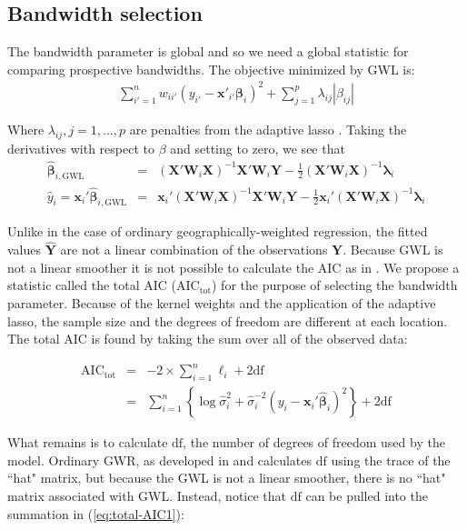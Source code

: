 \documentclass[authoryear, review, 11pt]{elsarticle}
\begin{document}
	\subsection{Bandwidth selection}
	The bandwidth parameter is global and so we need a global statistic for comparing prospective bandwidths. The objective minimized by GWL is:	
	\begin{eqnarray}
		\sum_{i'=1}^n w_{ii'} \left(y_{i'} - \bm{x}'_{i'} \bm{\beta}_i \right)^2 + \sum_{j=1}^p \lambda_{ij} |\beta_{ij}|
	\end{eqnarray}
	
	Where $\lambda_{ij}, j =1, \dots, p$ are penalties from the adaptive lasso \citep{Zou:2006}. Taking the derivatives with respect to $\beta$ and setting to zero, we see that
	\begin{eqnarray}
		\hat{\bm{\beta}}_{i, \text{GWL}} &=& \left( \bm{X}'\bm{W}_i\bm{X} \right)^{-1}  \bm{X}'\bm{W}_i\bm{Y}  - \frac{1}{2} \left(\bm{X}'\bm{W}_i\bm{X} \right)^{-1} \bm{\lambda}_i\\
		\hat{y}_i = \bm{x}_i' \hat{\bm{\beta}}_{i, \text{GWL}} &=&  \bm{x}_i' \left( \bm{X}'\bm{W}_i\bm{X} \right)^{-1}  \bm{X}'\bm{W}_i\bm{Y}  - \frac{1}{2} \bm{x}_i' \left(\bm{X}'\bm{W}_i\bm{X} \right)^{-1} \bm{\lambda}_i
	\end{eqnarray}
	
	Unlike in the case of ordinary geographically-weighted regression, the fitted values $\hat{\bm{Y}}$ are not a linear combination of the observations $\bm{Y}$. Because GWL is not a linear smoother it is not possible to calculate the AIC as in \cite{Fotheringham:2002} \citep{Zou:2006}. We propose a statistic called the total AIC ($\mbox{AIC}_{\text{tot}}$) for the purpose of selecting the bandwidth parameter. Because of the kernel weights and the application of the adaptive lasso, the sample size and the degrees of freedom are different at each location. The total AIC is found by taking the sum over all of the observed data:	
		
	\begin{eqnarray}
		\mbox{AIC}_{\mbox{tot}} &=& -2 \times \sum_{i=1}^n \ell_i + 2 \mbox{df}\\
		&=& \sum_{i=1}^n \left\{ \log \hat{\sigma}_i^2 + \hat{\sigma}_i^{-2} \left(y_i - \bm{x}_i' \hat{\bm{\beta}}_i \right)^2 \right\} + 2 \mbox{df}\label{eq:total-AIC1}
	\end{eqnarray}	
	
	What remains is to calculate $\mbox{df}$, the number of degrees of freedom used by the model. Ordinary GWR, as developed in \cite{Loader:1999} and \cite{Fotheringham:2002} calculates $\mbox{df}$ using the trace of the ``hat" matrix, but because the GWL is not a linear smoother, there is no ``hat" matrix associated with GWL. Instead, notice that $\mbox{df}$ can be pulled into the summation in (\ref{eq:total-AIC1}):
		
\end{document}
